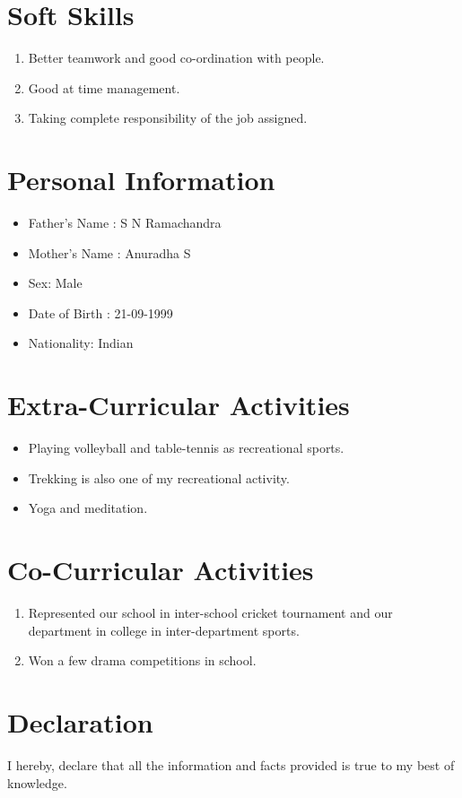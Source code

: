 \documentclass{article}
\begin{document}
	\section{Soft Skills}
	\begin{enumerate}
		\item Better teamwork and good co-ordination with people.
		\item Good at time management.
		\item Taking complete responsibility of the job assigned.
	\end{enumerate}

	\section{Personal Information}
	\begin{itemize}
		\item Father’s Name : S N Ramachandra
		\item Mother’s Name : Anuradha S
		\item Sex: Male
		\item Date of Birth : 21-09-1999
		\item Nationality: Indian
	\end{itemize}

	\section{Extra-Curricular Activities}
	\begin{itemize}
		\item Playing volleyball and table-tennis as recreational sports.
		\item Trekking is also one of my recreational activity.
		\item Yoga and meditation.
	\end{itemize}

	\section{Co-Curricular Activities}
	\begin{enumerate}
		\item  Represented our school in inter-school cricket tournament and our department in college in inter-department sports.
		\item Won a few drama competitions in school.
	\end{enumerate}

	\section{Declaration}
	I hereby, declare that all the information and facts provided is true to my best of knowledge.
	
	 
\end{document}
